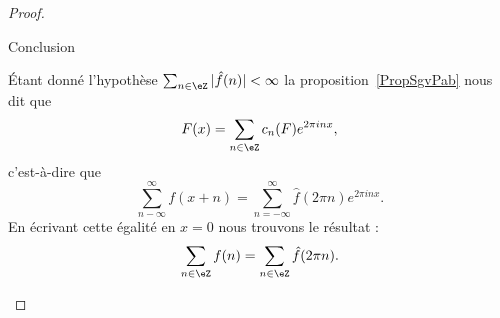 \begin{proof}
\begin{subproof}
    \item[Conclusion]

        Étant donné l'hypothèse \( \sum_{n\in \eZ}| \hat f(n) |<\infty\) la proposition~\ref{PropSgvPab} nous dit que
        \begin{equation}
            F(x)=\sum_{n\in \eZ}c_n(F) e^{2\pi inx},
        \end{equation}
        c'est-à-dire que
        \begin{equation}
            \sum_{n-\infty}^{\infty}f(x+n)=\sum_{n=-\infty}^{\infty}\hat f(2\pi n) e^{2\pi i nx}.
        \end{equation}
        En écrivant cette égalité en \( x=0\) nous trouvons le résultat :
        \begin{equation}
            \sum_{n\in \eZ}f(n)=\sum_{n\in \eZ}\hat f(2\pi n).
        \end{equation}
    \end{subproof}
\end{proof}

